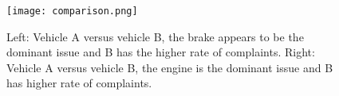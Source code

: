 % 
% 

	\begin{figure}
	 \centering  
	 \texttt{[image: comparison.png]}
	 \caption[Comparison View]{Left: Vehicle A versus vehicle B, the brake appears
	 to be the dominant issue and B has the higher rate of complaints. Right:
	 Vehicle A versus vehicle B, the engine is the dominant issue and B has higher rate of complaints.}
	 \label{figure:comparison}
	\end{figure}
 
